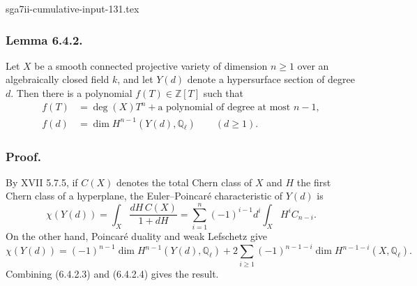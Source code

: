 \begin{filecontents*}{sga7ii-cumulative-input-131.tex}
\subsubsection*{Lemma 6.4.2.}
Let $X$ be a smooth connected projective variety of dimension $n\ge1$
over an algebraically closed field $k$, and let $Y(d)$ denote a
hypersurface section of degree $d$.  Then there is a polynomial
$f(T)\in\mathbb Z[T]$ such that
\begin{align}
f(T)&=\deg(X)T^n+\text{a polynomial of degree at most }n-1,
  \tag{6.4.2.1}\\
f(d)&=\dim H^{n-1}(Y(d),\mathbb Q_\ell)\qquad(d\ge1).
  \tag{6.4.2.2}
\end{align}

\subsubsection*{Proof.}
By XVII 5.7.5, if $C(X)$ denotes the total Chern class of $X$ and $H$
the first Chern class of a hyperplane, the Euler--Poincaré
characteristic of $Y(d)$ is
\begin{equation}\tag{6.4.2.3}
\chi(Y(d))
=\int_X\frac{dH\,C(X)}{1+dH}
=\sum_{i=1}^{n}(-1)^{i-1}d^i\int_X H^iC_{n-i}.
\end{equation}
On the other hand, Poincaré duality and weak Lefschetz give
\begin{equation}\tag{6.4.2.4}
\chi(Y(d))
=(-1)^{n-1}\dim H^{n-1}(Y(d),\mathbb Q_\ell)
+2\sum_{i\ge1}(-1)^{n-1-i}
  \dim H^{n-1-i}(X,\mathbb Q_\ell).
\end{equation}
Combining (6.4.2.3) and (6.4.2.4) gives the result.

\end{filecontents*}

